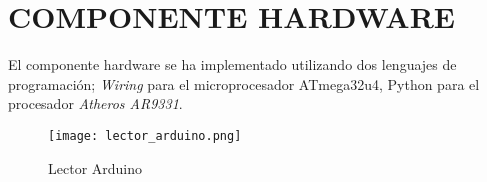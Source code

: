 \section{COMPONENTE HARDWARE}

El componente hardware se ha implementado utilizando dos lenguajes de programación; \emph{Wiring} para el microprocesador ATmega32u4, Python para el procesador \emph{Atheros AR9331}.

\begin{figure}[H]
    \centering
    \texttt{[image: lector\_arduino.png]}
    \caption{Lector Arduino}\label{fig:lector-arduino}
\end{figure}










